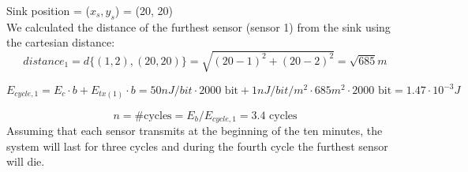 Sink position = ($x_s, y_s$) = (20, 20)\\

We calculated the distance of the furthest sensor (sensor 1) from the sink using the cartesian distance: \[ distance_1 = d \{(1, 2) , (20, 20)\} = \sqrt{(20-1)^2 + (20-2)^2} = \sqrt{685} m \]

\[
E_{cycle, 1} = E_c \cdot b + E_{tx(1)} \cdot b = 50 nJ/bit \cdot 2000 \text{ bit} + 1 nJ/bit/m^2 \cdot 685 m^2 \cdot 2000 \text{ bit} = 1.47 \cdot 10^{-3} J
\]

\[
n = \text{\# cycles} = E_b / E_{cycle, 1} = 3.4 \text{ cycles}
\]
Assuming that each sensor transmits at the beginning of the ten minutes, the system will last for three cycles and during the fourth cycle the furthest sensor will die.
